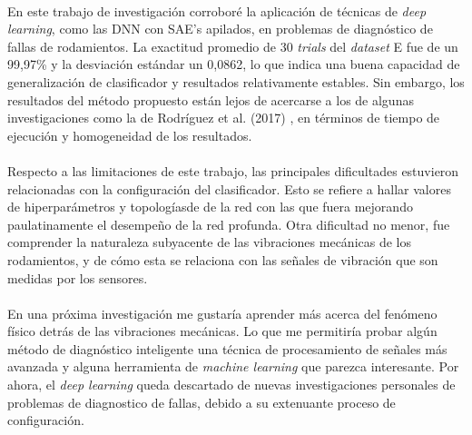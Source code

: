 \documentclass[12pt]{article}
\begin{document}
\paragraph{}
En este trabajo de investigación corroboré la aplicación de técnicas de \textit{deep learning}, como las DNN con SAE's apilados, en problemas de diagnóstico de fallas de rodamientos. La exactitud promedio de 30 \textit{trials} del \textit{dataset} E fue de un 99,97\% y la desviación estándar un 0,0862, lo que indica una buena capacidad de generalización de clasificador y resultados relativamente estables. Sin embargo, los resultados del método propuesto están lejos de acercarse a los de algunas investigaciones como la de Rodríguez et al. (2017) \cite{nibaldo}, en términos de tiempo de ejecución y homogeneidad de los resultados.

\paragraph{}
Respecto a las limitaciones de este trabajo, las principales dificultades estuvieron relacionadas con la configuración del clasificador. Esto se refiere a hallar valores de hiperparámetros y topologíasde de la red con las que fuera mejorando paulatinamente el desempeño de la red profunda. Otra dificultad no menor, fue comprender la naturaleza subyacente de las vibraciones mecánicas de los rodamientos, y de cómo esta se relaciona con las señales de vibración que son medidas por los sensores. 

\paragraph{}
En una próxima investigación me gustaría aprender más acerca del fenómeno físico detrás de las vibraciones mecánicas. Lo que me permitiría probar algún método de diagnóstico inteligente una técnica de procesamiento de señales más avanzada y alguna herramienta de \textit{machine learning} que parezca interesante. Por ahora, el \textit{deep learning} queda descartado de nuevas investigaciones personales de problemas de diagnostico de fallas, debido a su extenuante proceso de configuración.

\clearpage
\end{document}
